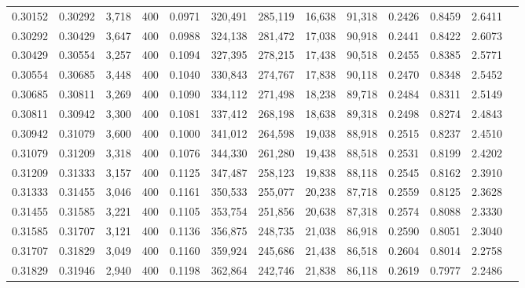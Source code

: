 \begin{tabular}{rrrrrrrrrrrrr}
0.30152 & 0.30292 &  3,718 &   400 &                                     0.0971 & 320,491 & 285,119 &  16,638 &  91,318 & 0.2426 & 0.8459 & 2.6411 \\
0.30292 & 0.30429 &  3,647 &   400 &                                     0.0988 & 324,138 & 281,472 &  17,038 &  90,918 & 0.2441 & 0.8422 & 2.6073 \\
0.30429 & 0.30554 &  3,257 &   400 &                                     0.1094 & 327,395 & 278,215 &  17,438 &  90,518 & 0.2455 & 0.8385 & 2.5771 \\
0.30554 & 0.30685 &  3,448 &   400 &                                     0.1040 & 330,843 & 274,767 &  17,838 &  90,118 & 0.2470 & 0.8348 & 2.5452 \\
0.30685 & 0.30811 &  3,269 &   400 &                                     0.1090 & 334,112 & 271,498 &  18,238 &  89,718 & 0.2484 & 0.8311 & 2.5149 \\
0.30811 & 0.30942 &  3,300 &   400 &                                     0.1081 & 337,412 & 268,198 &  18,638 &  89,318 & 0.2498 & 0.8274 & 2.4843 \\
0.30942 & 0.31079 &  3,600 &   400 &                                     0.1000 & 341,012 & 264,598 &  19,038 &  88,918 & 0.2515 & 0.8237 & 2.4510 \\
0.31079 & 0.31209 &  3,318 &   400 &                                     0.1076 & 344,330 & 261,280 &  19,438 &  88,518 & 0.2531 & 0.8199 & 2.4202 \\
0.31209 & 0.31333 &  3,157 &   400 &                                     0.1125 & 347,487 & 258,123 &  19,838 &  88,118 & 0.2545 & 0.8162 & 2.3910 \\
0.31333 & 0.31455 &  3,046 &   400 &                                     0.1161 & 350,533 & 255,077 &  20,238 &  87,718 & 0.2559 & 0.8125 & 2.3628 \\
0.31455 & 0.31585 &  3,221 &   400 &                                     0.1105 & 353,754 & 251,856 &  20,638 &  87,318 & 0.2574 & 0.8088 & 2.3330 \\
0.31585 & 0.31707 &  3,121 &   400 &                                     0.1136 & 356,875 & 248,735 &  21,038 &  86,918 & 0.2590 & 0.8051 & 2.3040 \\
0.31707 & 0.31829 &  3,049 &   400 &                                     0.1160 & 359,924 & 245,686 &  21,438 &  86,518 & 0.2604 & 0.8014 & 2.2758 \\
0.31829 & 0.31946 &  2,940 &   400 &                                     0.1198 & 362,864 & 242,746 &  21,838 &  86,118 & 0.2619 & 0.7977 & 2.2486 \\

\end{tabular}
